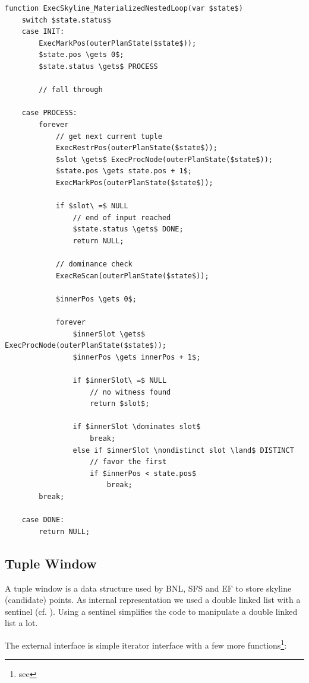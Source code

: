 \begin{lstlisting}[language=pseudo,
caption={Pseudo-code for MNL},
label={code:mnl}
]
function ExecSkyline_MaterializedNestedLoop(var $state$)
	switch $state.status$
	case INIT:
		ExecMarkPos(outerPlanState($state$));
		$state.pos \gets 0$;
		$state.status \gets$ PROCESS

		// fall through

	case PROCESS:
		forever
			// get next current tuple
			ExecRestrPos(outerPlanState($state$));
			$slot \gets$ ExecProcNode(outerPlanState($state$));
			$state.pos \gets state.pos + 1$;
			ExecMarkPos(outerPlanState($state$));

			if $slot\ =$ NULL
				// end of input reached
				$state.status \gets$ DONE;
				return NULL;

			// dominance check
			ExecReScan(outerPlanState($state$));

			$innerPos \gets 0$;

			forever
				$innerSlot \gets$ ExecProcNode(outerPlanState($state$));
				$innerPos \gets innerPos + 1$;

				if $innerSlot\ =$ NULL
					// no witness found
					return $slot$;

				if $innerSlot \dominates slot$
					break;
				else if $innerSlot \nondistinct slot \land$ DISTINCT
					// favor the first
					if $innerPos < state.pos$
						break;
		break;

	case DONE:
		return NULL;
\end{lstlisting}

\subsection{Tuple Window}
A tuple window is a data structure used by BNL, SFS and EF to store
skyline (candidate) points. As internal representation we used a double
linked list with a sentinel (cf. \citep[Page 204--209]{Cormen2001}).
Using a sentinel simplifies the code to manipulate a double linked
list a lot.

The external interface is simple iterator interface with a few more
functions\footnote{see }:

